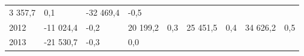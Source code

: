 \begin{longtable}[]{@{}lllllllll@{}}
\begin{minipage}[t]{0.12\columnwidth}
3 357,7\strut
\end{minipage} & \begin{minipage}[t]{0.06\columnwidth}\raggedright
0,1\strut
\end{minipage} & \begin{minipage}[t]{0.08\columnwidth}\raggedright
-32 469,4\strut
\end{minipage} & \begin{minipage}[t]{0.06\columnwidth}\raggedright
-0,5\strut
\end{minipage}\tabularnewline
\begin{minipage}[t]{0.05\columnwidth}\raggedright
2012\strut
\end{minipage} & \begin{minipage}[t]{0.10\columnwidth}\raggedright
-11 024,4\strut
\end{minipage} & \begin{minipage}[t]{0.06\columnwidth}\raggedright
-0,2\strut
\end{minipage} & \begin{minipage}[t]{0.17\columnwidth}\raggedright
20 199,2\strut
\end{minipage} & \begin{minipage}[t]{0.06\columnwidth}\raggedright
0,3\strut
\end{minipage} & \begin{minipage}[t]{0.12\columnwidth}\raggedright
25 451,5\strut
\end{minipage} & \begin{minipage}[t]{0.06\columnwidth}\raggedright
0,4\strut
\end{minipage} & \begin{minipage}[t]{0.08\columnwidth}\raggedright
34 626,2\strut
\end{minipage} & \begin{minipage}[t]{0.06\columnwidth}\raggedright
0,5\strut
\end{minipage}\tabularnewline
\begin{minipage}[t]{0.05\columnwidth}\raggedright
2013\strut
\end{minipage} & \begin{minipage}[t]{0.10\columnwidth}\raggedright
-21 530,7\strut
\end{minipage} & \begin{minipage}[t]{0.06\columnwidth}\raggedright
-0,3\strut
\end{minipage} & \begin{minipage}[t]{0.17\columnwidth}\raggedright
0,0\strut
\end{minipage} & \begin{minipage}[t]{0.06\columnwidth}\raggedright

\end{minipage}
\end{longtable}
